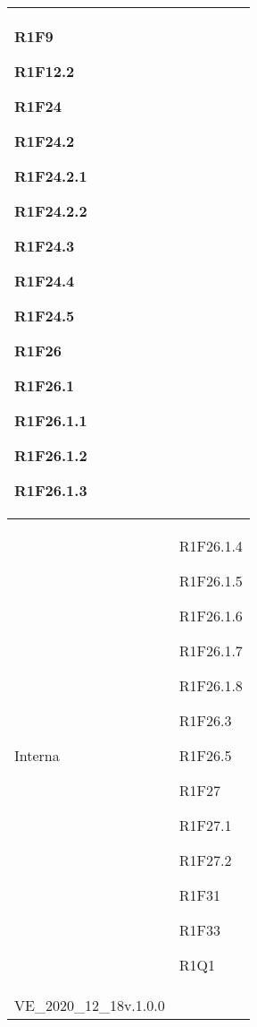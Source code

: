 \begin{center}
\begin{longtable}{|p{44mm}|p{22mm}|}
R1F9 \newline

R1F12.2 \newline

R1F24 \newline

R1F24.2 \newline

R1F24.2.1 \newline

R1F24.2.2 \newline

R1F24.3 \newline

R1F24.4 \newline

R1F24.5 \newline

R1F26 \newline

R1F26.1 \newline

R1F26.1.1 \newline

R1F26.1.2 \newline

R1F26.1.3
\\
\hline
Interna &
R1F26.1.4 \newline

R1F26.1.5 \newline

R1F26.1.6 \newline

R1F26.1.7 \newline

R1F26.1.8 \newline

R1F26.3 \newline

R1F26.5 \newline

R1F27 \newline

R1F27.1 \newline

R1F27.2 \newline

R1F31 \newline

R1F33 \newline

 R1Q1 \newline
\\
\hline
VE\_2020\_12\_18v.1.0.0 &


\end{longtable}
\end{center}
